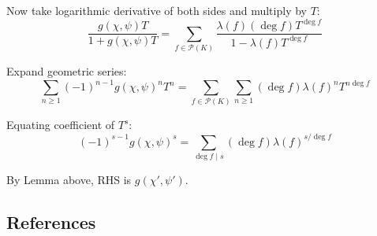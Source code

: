 \documentclass{template}
\begin{document}
Now take logarithmic derivative of both sides and multiply by $T$:
\begin{equation*}
    \frac{g(\chi,\psi)T}{1+g(\chi,\psi)T} = \sum_{f \in \mathcal{P}(K)}\frac{\lambda(f)(\deg f)T^{\deg f}}{1-\lambda(f)T^{\deg f}}
\end{equation*}

Expand geometric series:
\begin{equation*}
    \sum_{n \geq 1}(-1)^{n-1}g(\chi,\psi)^nT^n = \sum_{f \in \mathcal{P}(K)}\sum_{n \geq 1} (\deg f)\lambda(f)^nT^{n\deg f}
\end{equation*}

Equating coefficient of $T^s$:
\begin{equation*}
    (-1)^{s-1}g(\chi,\psi)^s = \sum_{\deg f \mid s} (\deg f)\lambda(f)^{s/\deg f}
\end{equation*}

By Lemma above, RHS is $g(\chi',\psi')$.

\subsection*{References}
\renewcommand{\refname}{\vspace{-1em}}


\end{document}
